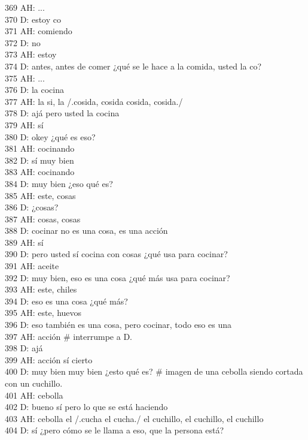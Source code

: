 369 AH: ...\\
370 D: estoy co\\
371 AH: comiendo\\
372 D: no\\
373 AH: estoy\\
374 D: antes, antes de comer ¿qué se le hace a la comida, usted la co?\\
375 AH: ...\\
376 D: la cocina\\
377 AH: la si, la /.cosida, cosida cosida, cosida./\\
378 D: ajá pero usted la cocina\\
379 AH: sí\\
380 D: okey ¿qué es eso?\\
381 AH: cocinando\\
382 D: sí muy bien\\
383 AH: cocinando\\
384 D: muy bien ¿eso qué es?\\
385 AH: este, cosas\\
386 D: ¿cosas?\\
387 AH: cosas, cosas\\
388 D: cocinar no es una cosa, es una acción\\
389 AH: sí\\
390 D: pero usted sí cocina con cosas ¿qué usa para cocinar?\\
391 AH: aceite\\
392 D: muy bien, eso es una cosa ¿qué más usa para cocinar?\\
393 AH: este, chiles\\
394 D: eso es una cosa ¿qué más?\\
395 AH: este, huevos\\
396 D: eso también es una cosa, pero cocinar, todo eso es una\\
397 AH: acción \# interrumpe a D.\\
398 D: ajá\\
399 AH: acción sí cierto\\
400 D: muy bien muy bien ¿esto qué es? \# imagen de una cebolla siendo cortada con un cuchillo.\\
401 AH: cebolla\\
402 D: bueno sí pero lo que se está haciendo\\
403 AH: cebolla el /.cucha el cucha./ el cuchillo, el cuchillo, el cuchillo\\
404 D: sí ¿pero cómo se le llama a eso, que la persona está?\\
